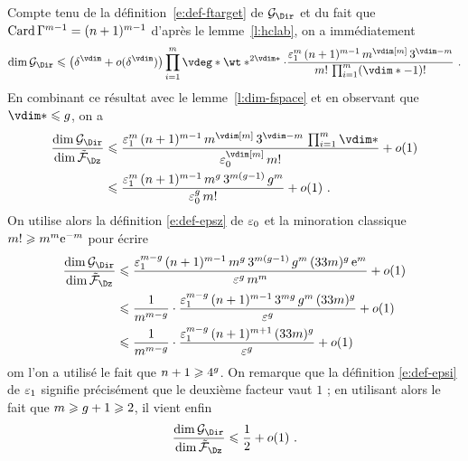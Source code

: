 Compte tenu de la définition~\eqref{e:def-ftarget} de \( \ftarget \) et du fait
que \( \operatorname{Card} \Gamma^{m-1} = (n + 1)^{m-1} \) d'après le
lemme~\ref{l:hclab}, on a immédiatement
\begin{equation}
  \dim \ftarget
  \le
  \bigl(\delta^\vdim + o(\delta^\vdim)\bigr)
  \prod\fctrange \vdeg* \wt*^{2\vdim*}
  \cdot
  \frac {
    \epsi^\puiss
    \, (\dimp + 1)^{\puiss-1}
    \, \puiss^{\vdim[\puiss]}
    \, 3^{\vdim - \puiss}
  }{
    \puiss!
    \, \prod\fctrange (\vdim* - 1)!
  }
  \pmm.
\end{equation}
En combinant ce résultat avec le lemme~\ref{l:dim-fspace} et en observant que
\( \vdim* \le \genre \), on a
\begin{align}
  \frac {\dim \ftarget} {\dim \fspace}
  & \le
  \frac {
    \epsi^\puiss
    \, (\dimp + 1)^{\puiss-1}
    \, \puiss^{\vdim[\puiss]}
    \, 3^{\vdim - \puiss}
    \, \prod\fctrange \vdim*
  }{
    \epsz^{\vdim[\puiss]}
    \, \puiss!
  }
  + o(1)
  \\ & \le
  \frac {
    \epsi^\puiss
    \, (\dimp + 1)^{\puiss-1}
    \, \puiss ^{\genre}
    \, 3 ^{\puiss (\genre-1)}
    \, \genre^\puiss
  }{
    \epsz^\genre
    \, \puiss!
  }
  + o(1)
  \pmm.
\end{align}
On utilise alors la définition \eqref{e:def-epsz} de \( \varepsilon\sb0 \) et la
minoration classique \( m! \geqslant m^m \mathrm e^{-m} \) pour
écrire
\begin{align}
  \frac {\dim \ftarget} {\dim \fspace}
  & \le
  \frac {
    \epsi^{\puiss-\genre}
    \, (\dimp + 1)^{\puiss-1}
    \, \puiss ^{\genre}
    \, 3 ^{\puiss (\genre-1)}
    \, \genre^\puiss
    \, (33\puiss)^\genre
    \, \expb^\puiss
  }{
    \eps^\genre
    \, \puiss^\puiss
  }
  + o(1)
  \\ & \le
  \frac 1 { \puiss^{\puiss-\genre} }
  \cdot
  \frac {
    \epsi^{\puiss-\genre}
    \, (\dimp + 1)^{\puiss-1}
    \, 3 ^{\puiss \genre}
    \, \genre^\puiss
    \, (33\puiss)^\genre
  }{
    \eps^\genre
  }
  + o(1)
  \\ & \le
  \frac 1 { \puiss^{\puiss-\genre} }
  \cdot
  \frac {
    \epsi^{\puiss-\genre}
    \, (\dimp + 1)^{\puiss+1}
    \, (33\puiss)^\genre
  }{
    \eps^\genre
  }
  + o(1)
\end{align}
om l'on a utilisé le fait que \( n + 1 \geqslant 4^g \).  On remarque que
la définition \eqref{e:def-epsi} de \( \varepsilon\sb1 \) signifie précisément que le
deuxième facteur vaut \( 1 \) ; en utilisant alors le fait que \( m \geqslant
  g + 1 \geqslant 2 \), il vient enfin
\begin{equation} \label{e:good-codim}
  \frac {\dim \ftarget} {\dim \fspace}
  \le
  \frac12
  + o(1)
  \pmm.
\end{equation}

